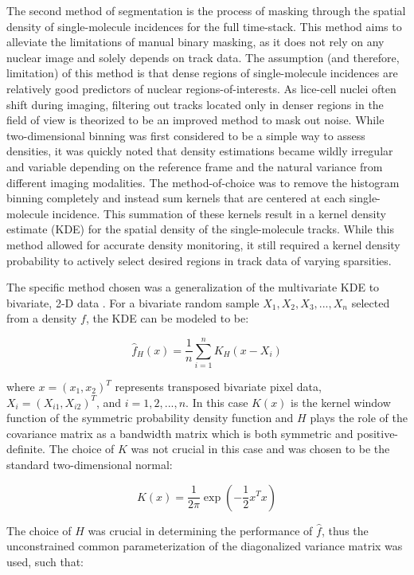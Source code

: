 \documentclass{bioinfo}
\begin{document}
The second method of segmentation is the process of masking through the spatial density of single-molecule incidences for the full time-stack. This method aims to alleviate the limitations of manual binary masking, as it does not rely on any nuclear image and solely depends on track data. The assumption (and therefore, limitation) of this method is that dense regions of single-molecule incidences are relatively good predictors of nuclear regions-of-interests. As lice-cell nuclei often shift during imaging, filtering out tracks located only in denser regions in the field of view is theorized to be an improved method to mask out noise. While two-dimensional binning was first considered to be a simple way to assess densities, it was quickly noted that density estimations became wildly irregular and variable depending on the reference frame and the natural variance from different imaging modalities. The method-of-choice was to remove the histogram binning completely and instead sum kernels that are centered at each single-molecule incidence. This summation of these kernels result in a kernel density estimate (KDE) for the spatial density of the single-molecule tracks. While this method allowed for accurate density monitoring, it still required a kernel density probability to actively select desired regions in track data of varying sparsities.

The specific method chosen was a generalization of the multivariate KDE to bivariate, 2-D data \citep{Venables}. For a bivariate random sample $X_1, X_2, X_3,..., X_n$ selected from a density $f$, the KDE can be modeled to be:

\begin{equation}
\hat{f}_H(x) = \frac{1}{n}\sum_{i=1}^{n}K_H(x-X_i)
\end{equation}

where $x = (x_1, x_2)^T$ represents transposed bivariate pixel data, $X_i = (X_{i1}, X_{i2})^T$, and $i = 1, 2,...,n$. In this case $K(x)$ is the kernel window function of the symmetric probability density function and $H$ plays the role of the covariance matrix as a bandwidth matrix which is both symmetric and positive-definite. The choice of $K$ was not crucial in this case and was chosen to be the standard two-dimensional normal:

\begin{equation}
K(x) = \frac{1}{2 \pi} \exp(-\frac{1}{2}x^Tx) 
\end{equation}

The choice of $H$ was crucial in determining the performance of $\hat{f}$, thus the unconstrained common parameterization of the diagonalized variance matrix was used, such that:
\end{document}
